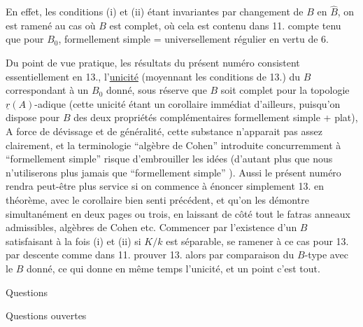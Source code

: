En effet, les conditions (i) et (ii) étant invariantes par changement
de $B$ en $\widehat{B}$, on est ramené au cas où $B$ est complet, où cela est contenu
dans 11.  compte tenu que pour $B_0$, formellement simple = universellement
régulier en vertu de 6.

Du point de vue pratique, les résultats du présent numéro consistent
essentiellement en 13.,  l'\uline{unicité}  (moyennant les conditions
de 13.) du $B$ correspondant à un $B_0$ donné, sous réserve que $B$ soit
complet pour la topologie $\underline{r}(A)$-adique (cette  unicité étant un
corollaire immédiat d'ailleurs, puisqu'on dispose pour $B$ des deux propriétés
complémentaires formellement simple + plat),
A force de dévissage et
de généralité, cette substance n'apparait pas assez clairement, et la
terminologie ``algèbre de Cohen'' introduite concurremment à ``formellement
simple'' risque  d'embrouiller  les idées (d'autant plus que nous
n'utiliserons plus jamais que ``formellement simple'' ). Aussi le présent
numéro rendra peut-être plus service si on commence à énoncer simplement
13. en théorème, avec le corollaire bien senti précédent, et qu'on
les démontre simultanément en deux pages ou trois,  en laissant de
côté tout le fatras anneaux admissibles, algèbres de Cohen etc. Commencer
par l'existence d'un $B$ satisfaisant à la fois (i) et (ii) si $K/k$ est
séparable, se ramener à ce cas pour 13. par descente comme dans 11.
prouver 13. alors par comparaison du $B$-type avec le $B$ donné, ce qui
donne en même temps l'unicité, et un point c'est tout.




Questions



Questions ouvertes

